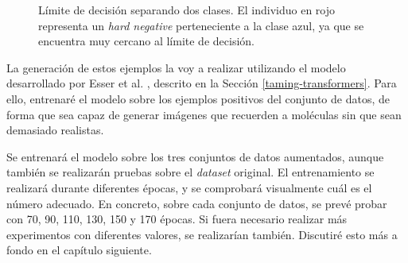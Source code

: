 \begin{figure}[H]
\centering
    \caption{Límite de decisión separando dos clases. El individuo en rojo representa un \textit{hard negative} perteneciente a la clase azul, ya que se encuentra muy cercano al límite de decisión.}
    \label{fig:hard-negatives}
\end{figure}

La generación de estos ejemplos la voy a realizar utilizando el modelo desarrollado por Esser et al. \cite{esser2021taming}, descrito en la Sección \ref{taming-transformers}. Para ello, entrenaré el modelo sobre los ejemplos positivos del conjunto de datos, de forma que sea capaz de generar imágenes que recuerden a moléculas sin que sean demasiado realistas. 

Se entrenará el modelo sobre los tres conjuntos de datos aumentados, aunque también se realizarán pruebas sobre el \textit{dataset} original. El entrenamiento se realizará durante diferentes épocas, y se comprobará visualmente cuál es el número adecuado. En concreto, sobre cada conjunto de datos, se prevé probar con 70, 90, 110, 130, 150 y 170 épocas. Si fuera necesario realizar más experimentos con diferentes valores, se realizarían también. Discutiré esto más a fondo en el capítulo siguiente.

